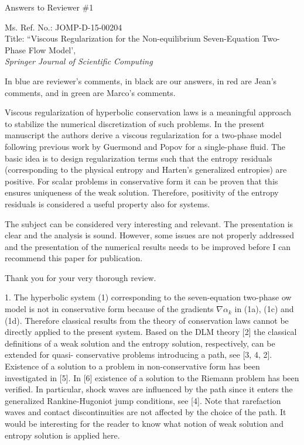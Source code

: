 \documentclass{article}
\newcommand{\tcr}[1]{\textcolor{red}{#1}}
\begin{document}

\begin{center}
{ \Large Answers to Reviewer \#1}
\end{center}

\bigskip

\noindent Ms. Ref. No.: JOMP-D-15-00204\\
Title: ``Viscous Regularization for the Non-equilibrium Seven-Equation Two-Phase Flow Model', \\
{\it Springer Journal of Scientific Computing}\\

\bigskip

In {\color{blue}blue} are reviewer's comments, in black are our answers, in {\color{red}red} are Jean's comments,
and in {\color{green}green} are Marco's comments.

\fbox{\fbox{\parbox{0.9\textwidth}{\tcr{Line numbers: we will need to convert them the the Springer format before we resubmit. The current numbers 
are obtained using another format!}}}}

\bigskip

{\color{blue}
Viscous regularization of hyperbolic conservation laws is a meaningful approach to stabilize
the numerical discretization of such problems. In the present manuscript the authors derive
a viscous regularization for a two-phase model following previous work by Guermond and
Popov for a single-phase fluid. The basic idea is to design regularization terms such that
the entropy residuals (corresponding to the physical entropy and Harten's generalized
entropies) are positive. For scalar problems in conservative form it can be proven that this
ensures uniqueness of the weak solution. Therefore, positivity of the entropy residuals is
considered a useful property also for systems.

The subject can be considered very interesting and relevant. The presentation is clear
and the analysis is sound. However, some issues are not properly addressed and the
presentation of the numerical results needs to be improved before I can recommend this
paper for publication.}

Thank you for your very thorough review. 
\bigskip


{\color{blue}
1. The hyperbolic system (1) corresponding to the seven-equation two-phase ow model
is not in conservative form because of the gradients $\nabla \alpha_k$ in (1a), (1c) and (1d).
Therefore classical results from the theory of conservation laws cannot be directly
applied to the present system. Based on the DLM theory [2] the classical definitions
of a weak solution and the entropy solution, respectively, can be extended for quasi-
conservative problems introducing a path, see [3, 4, 2]. Existence of a solution to
a problem in non-conservative form has been investigated in [5]. In [6] existence of
a solution to the Riemann problem has been verified. In particular, shock waves
are influenced by the path since it enters the generalized Rankine-Hugoniot jump
conditions, see [4]. Note that rarefaction waves and contact discontinuities are not
affected by the choice of the path. It would be interesting for the reader to know
what notion of weak solution and entropy solution is applied here.}
\end{document}
